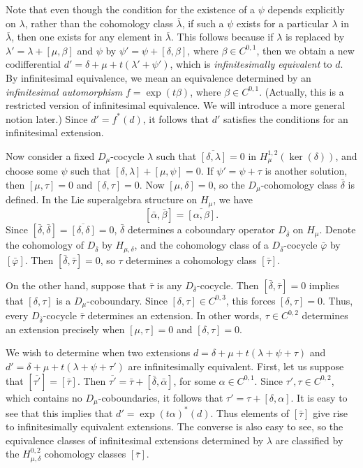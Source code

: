 \documentclass[12pt]{amsart}
\theoremstyle{definition}
\begin{document}
Note that even though the condition for the existence of a $\psi$
depends explicitly on $\lambda$, rather than the cohomology class
$\overline{\lambda}$, if such a $\psi$ exists for a particular
$\lambda$ in $\overline{\lambda}$, then one exists for any element
in $\overline{\lambda}$. This follows because if  $\lambda$ is
replaced by $\lambda'=\lambda+[\mu,\beta]$ and $\psi$ by
$\psi'=\psi+[\delta,\beta]$, where $\beta\in C^{0,1}$, then we
obtain a new codifferential $d'=\delta+\mu+t(\lambda'+\psi')$, which
is \emph{infinitesimally equivalent} to $d$. By infinitesimal
equivalence, we mean an equivalence determined  by an
\emph{infinitesimal automorphism} $f=\exp(t\beta)$, where $\beta\in
C^{0,1}$. (Actually, this is a restricted version of infinitesimal
equivalence. We will introduce a more general notion later.) Since
$d'=f^*(d)$, it follows that $d'$ satisfies the conditions for an
infinitesimal extension.

Now consider a fixed $D_\mu$-cocycle $\lambda$ such that $\overline{[\delta,\lambda]}=0$ in
$H_\mu^{1,2}(\ker(\delta))$, and choose some $\psi$ such  that
$[\delta,\lambda]+[\mu,\psi]=0$.  If $\psi'=\psi+\tau$ is another solution, then $[\mu,\tau]=0$
and $[\delta,\tau]=0$. Now $[\mu,\delta]=0$, so the $D_\mu$-cohomology class
$\bar\delta$ is defined. In the Lie superalgebra structure on
${H_\mu}$, we have
$$[\bar\alpha,\bar\beta]=\overline{[\alpha,\beta]}.$$
Since $[\bar\delta,\bar\delta]=\overline{[\delta,\delta]}=0$,
$\bar\delta$ determines a coboundary operator
$D_{\bar\delta}$ on ${H_\mu}$. Denote the cohomology of $D_{\bar\delta}$ by $H_{\mu,\delta}$, and the
cohomology class of a $D_{\bar\delta}$-cocycle $\bar{\varphi}$ by $[\bar{\varphi}]$. Then $[\bar\delta,\bar\tau]=0$,
so $\tau$ determines a cohomology class $[\bar\tau]$.

On the other hand, suppose that $\bar\tau$ is
any $D_{\bar\delta}$-cocycle.
Then $[\bar\delta,\bar\tau]=0$ implies that $[\delta,\tau]$ is a $D_\mu$-coboundary. Since
$[\delta,\tau]\in C^{0,3}$, this forces $[\delta,\tau]=0$. Thus, every $D_{\bar\delta}$-cocycle $\bar\tau$ determines
an extension. In other words, $\tau\in C^{0,2}$ determines an extension precisely when $[\mu,\tau]=0$
and $[\delta,\tau]=0$.

We wish to determine when two extensions $d=\delta+\mu+t(\lambda+\psi+\tau)$ and $d'=\delta+\mu+t(\lambda+\psi+\tau')$
are infinitesimally equivalent.  First, let us suppose that $[\overline{\tau'}]=[\bar\tau]$. Then
$\overline{\tau'}=\bar\tau+[\bar\delta,\bar\alpha]$, for some $\alpha\in C^{0,1}$.  Since $\tau',\tau\in C^{0,2}$, which
contains no $D_\mu$-coboundaries, it follows that $\tau'=\tau+[\delta,\alpha]$. It is easy to see that this
implies that $d'=\exp(t\alpha)^*(d)$. Thus elements of $[\bar\tau]$ give rise to infinitesimally
equivalent extensions.  The converse is also easy to see, so the equivalence classes of infinitesimal
extensions determined by $\lambda$ are classified by the $H_{\mu,\delta}^{0,2}$ cohomology classes $[\bar\tau]$.
\end{document}
